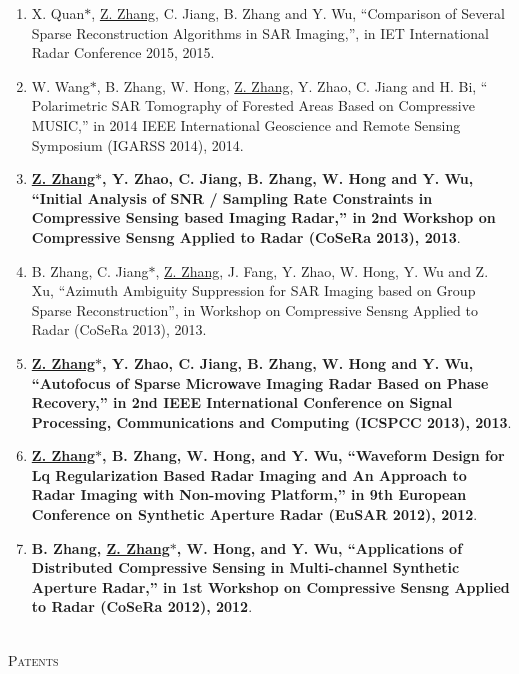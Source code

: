 \documentclass[paper=a4,fontsize=11pt]{scrartcl}
\begin{document}
\begin{enumerate}
	\item X. Quan$\ast$, \underline{Z. Zhang}, C. Jiang, B. Zhang and Y. Wu, ``Comparison of Several Sparse Reconstruction Algorithms in SAR Imaging,'', in IET International Radar Conference 2015, 2015.
	
	\item W. Wang$\ast$, B. Zhang, W. Hong, \underline{Z. Zhang}, Y. Zhao, C. Jiang and H. Bi, `` Polarimetric SAR Tomography of Forested Areas Based on Compressive MUSIC,'' in 2014 IEEE International Geoscience and Remote Sensing Symposium (IGARSS 2014), 2014.
	
	\item \textbf{\underline{Z. Zhang$\ast$}, Y. Zhao, C. Jiang, B. Zhang, W. Hong and Y. Wu, ``Initial Analysis of SNR / Sampling Rate Constraints in Compressive Sensing based Imaging Radar,'' in 2nd Workshop on Compressive Sensng Applied to Radar (CoSeRa 2013), 2013}.
	
	\item B. Zhang, C. Jiang$\ast$, \underline{Z. Zhang}, J. Fang, Y. Zhao, W. Hong, Y. Wu and Z. Xu, ``Azimuth Ambiguity Suppression for SAR Imaging based on Group Sparse Reconstruction'', in Workshop on Compressive Sensng Applied to Radar (CoSeRa 2013), 2013.
	
	\item \textbf{\underline{Z. Zhang$\ast$}, Y. Zhao, C. Jiang, B. Zhang, W. Hong and Y. Wu, ``Autofocus of Sparse Microwave Imaging Radar Based on Phase Recovery,'' in 2nd IEEE International Conference on Signal Processing, Communications and Computing (ICSPCC 2013), 2013}.
	
	\item \textbf{\underline{Z. Zhang$\ast$}, B. Zhang, W. Hong, and Y. Wu, ``Waveform Design for Lq Regularization Based Radar Imaging and An Approach to Radar Imaging with Non-moving Platform,'' in 9th European Conference on Synthetic Aperture Radar (EuSAR 2012), 2012}.
	
	\item \textbf{B. Zhang, \underline{Z. Zhang$\ast$}, W. Hong, and Y. Wu, ``Applications of Distributed Compressive Sensing in Multi-channel Synthetic Aperture Radar,'' in 1st Workshop on Compressive Sensng Applied to Radar (CoSeRa 2012), 2012}.
	
\end{enumerate}

~\\
\textsc{Patents}
\end{document}
